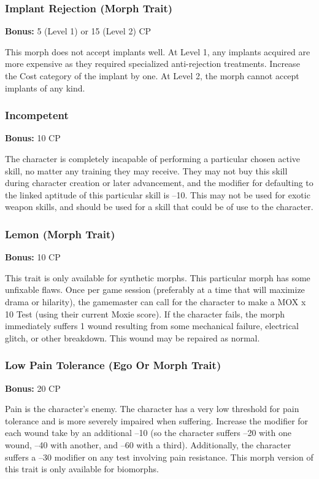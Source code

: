 \subsubsection{Implant Rejection (Morph Trait)}

\textbf{Bonus:} 5 (Level 1) or 15 (Level 2) CP

This morph does not accept implants well. At Level 
1, any implants acquired are more expensive as they 
required specialized anti-rejection treatments. Increase 
the Cost category of the implant by one. At Level 2, 
the morph cannot accept implants of any kind.

\subsubsection{Incompetent}

\textbf{Bonus:} 10 CP

The character is completely incapable of performing
a particular chosen active skill, no matter any
training they may receive. They may not buy this skill 
during character creation or later advancement, and 
the modifier for defaulting to the linked aptitude of 
this particular skill is –10. This may not be used for 
exotic weapon skills, and should be used for a skill 
that could be of use to the character.

\subsubsection{Lemon (Morph Trait)}

\textbf{Bonus:} 10 CP

This trait is only available for synthetic morphs. 
This particular morph has some unfixable flaws. Once 
per game session (preferably at a time that will maximize
drama or hilarity), the gamemaster can call for
the character to make a MOX x 10 Test (using their 
current Moxie score). If the character fails, the morph 
immediately suffers 1 wound resulting from some mechanical
failure, electrical glitch, or other breakdown.
This wound may be repaired as normal.

\subsubsection{Low Pain Tolerance (Ego Or Morph Trait)}

\textbf{Bonus:} 20 CP

Pain is the character's enemy. The character has 
a very low threshold for pain tolerance and is more 
severely impaired when suffering. Increase the modifier
for each wound take by an additional –10 (so
the character suffers –20 with one wound, –40 with 
another, and –60 with a third). Additionally, the 
character suffers a –30 modifier on any test involving 
pain resistance. This morph version of this trait is only 
available for biomorphs.

